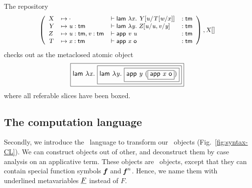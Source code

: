 \documentclass{llncs}
\begin{document}
\begin{example}
  The repository
$$
\small
\left(\begin{array}{llll}
    \meta X &\mapsto
    \envnil&\vdash
    \app{\cst{lam}} \lam x \smeta Y {\msubst u {\smeta T {\msubst w x}}} &:
    \cst{tm}
    \\
    \meta Y &\mapsto
    \env u {\cst{tm}} &\vdash
    \app{\cst{lam}} \lam y \smeta Z {\msubstcons {\msubst u
      {\var u}} v {\var y} } &:
    \cst{tm}
    \\
    \meta Z &\mapsto
    \envcons {\env u {\cst{tm}}} v {\cst{tm}} &\vdash
    \app{\app{\cst{app}}{\var v}}{\var u} &:
    \cst{tm}
    \\
    \meta T &\mapsto
    \env x {\cst{tm}} &\vdash
    \app{\cst{app}}\app{\var x}{\cst{o}} &:
    \cst{tm}

\end{array}\right), \smeta X {}
$$
checks out as the metaclosed atomic object
$$
\fbox{$
  \app {\cst{lam}} \lam x
  \fbox{$
    \app {\cst{lam}} \lam y
    \fbox{$
      \app {\cst{app}} \app {\var y}
      (\fbox{$
        \app{\cst{app}}\app{\var x}{\cst o}
      $})
    $}
  $}
$}
$$
where all referable slices have been boxed.
\end{example}

\subsection{The computation language}
\label{sec:comput}

Secondly, we introduce the \CL\ language to transform our \SLF\
objects (Fig.~\ref{fig:syntax-CL}). We can construct objects out of
other, and deconstruct them by case analysis on an applicative
term. These objects are \SLF\ objects, except that they can contain
special function symbols $\text{\textit{\textbf{f}}}$ and $\text{\textit{\textbf{f}}}^{n}$. Hence, we name them
with underlined metavariables $\underline{F}$ instead of $F$.
\end{document}
